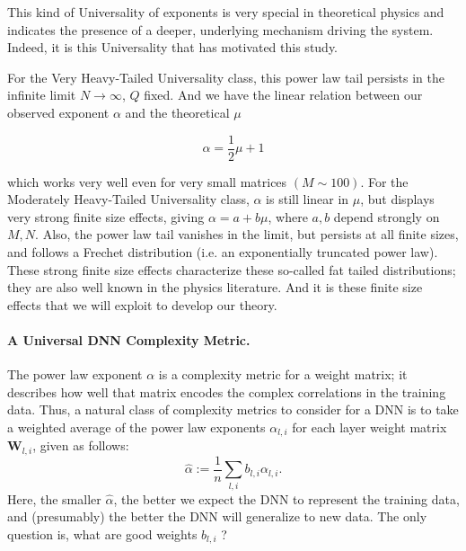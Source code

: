 This kind of Universality of exponents is very special in theoretical physics and indicates the presence of a deeper, 
underlying mechanism driving the system.  Indeed, it is this Universality that has motivated this study.

For the Very Heavy-Tailed Universality class, this power law tail persists in the infinite limit $N\rightarrow\infty$, $Q$ fixed.
And we have the linear relation between our observed exponent $\alpha$ and the theoretical $\mu$

$$\alpha=\dfrac{1}{2}\mu+1$$

which works very well even for very small matrices $(M\sim100)$.
For the Moderately Heavy-Tailed Universality class, $\alpha$ is still linear in $\mu$, but displays very strong finite size effects, giving $\alpha=a+b\mu$, where $a,b$ depend strongly on $M,N$. Also,  the power law tail vanishes in the limit, but persists at all finite sizes, and follows a Frechet distribution (i.e. an exponentially truncated power law). 
These strong finite size effects characterize these so-called fat tailed distributions; they are also well known in the physics literature\cite{SornetteBook,BouchaudPotters03}. 
And it is these finite size effects that we will exploit to develop our theory.


\paragraph{A Universal DNN Complexity Metric.} 

The power law exponent $\alpha$ is a complexity metric for a weight matrix; it describes how well that matrix encodes the complex correlations in the training data.
Thus, a natural class of complexity metrics to consider for a DNN is to take a weighted average of the power law exponents $\alpha_{l,i}$ for each layer weight matrix $\mathbf{W}_{l,i}$, given as follows:
\begin{equation}
\hat{\alpha}:=\dfrac{1}{n}\sum_{l,i}b_{l,i}\alpha_{l,i}  .
\label{eqn:alpha_hat_generic}
\end{equation}
Here, the smaller $\hat{\alpha}$, the better we expect the DNN to represent the training data, and (presumably) the better the DNN will generalize to new data.
The only question is, what are good weights $b_{l,i}$ ?

